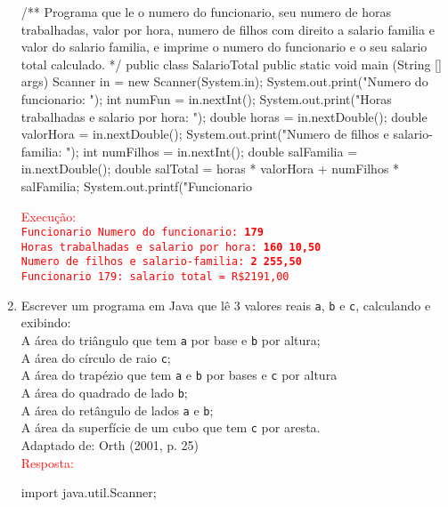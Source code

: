 \documentclass[onecolumn,a4paper,10pt]{report}
\newcommand{\+}{\, + \,}
\newcommand{\<}{\hspace*{-0.4cm}}
\begin{document}
\begin{enumerate}[1.]
\begin{javacode}
/**
   Programa que le o numero do funcionario, seu numero de horas trabalhadas,
   valor por hora, numero de filhos com direito a salario familia e valor do
   salario familia, e imprime o numero do funcionario e o seu salario total
   calculado.
*/
public class SalarioTotal {
    public static void main (String [] args) {
        Scanner in = new Scanner(System.in);
        System.out.print("Numero do funcionario: ");
        int numFun = in.nextInt();
        System.out.print("Horas trabalhadas e salario por hora: ");
        double horas = in.nextDouble();
        double valorHora = in.nextDouble();
        System.out.print("Numero de filhos e salario-familia: ");
        int numFilhos = in.nextInt();
        double salFamilia = in.nextDouble();
        double salTotal = horas * valorHora + numFilhos * salFamilia;
        System.out.printf("Funcionario %
    }
}
\end{javacode}
\textcolor{red}{Execução:\\
\texttt{Funcionario Numero do funcionario: \textbf{179}\\
Horas trabalhadas e salario por hora: \textbf{160 10,50}\\
Numero de filhos e salario-familia: \textbf{2 255,50}\\
Funcionario 179: salario total = R\$2191,00}
}

\item Escrever um programa em Java que lê 3 valores reais \texttt{a}, \texttt{b} e \texttt{c}, calculando e exibindo:\\
A área do triângulo que tem \texttt{a} por base e \texttt{b} por altura;\\
A área do círculo de raio \texttt{c};\\
A área do trapézio que tem \texttt{a} e \texttt{b} por bases e \texttt{c} por altura\\
A área do quadrado de lado \texttt{b};\\
A área do retângulo de lados \texttt{a} e \texttt{b};\\
A área da superfície de um cubo que tem \texttt{c} por aresta.\\
{\tiny Adaptado de: Orth (2001, p. 25)}\\
\textcolor{red}{Resposta:}\\
\begin{javacode}
import java.util.Scanner;


\end{javacode}
\end{enumerate}
\end{document}
